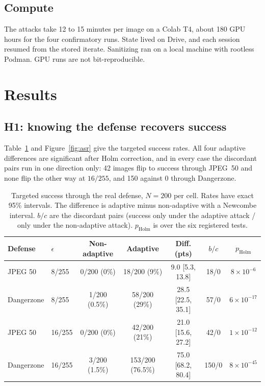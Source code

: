 \documentclass[11pt]{article}
\begin{document}
\subsection{Compute}
The attacks take 12 to 15 minutes per image on a Colab T4, about 180 GPU hours for the four
confirmatory runs. State lived on Drive, and each session resumed from the stored iterate.
Sanitizing ran on a local machine with rootless Podman. GPU runs are not bit-reproducible.

\section{Results}

\subsection{H1: knowing the defense recovers success}
Table~\ref{tab:h1} and Figure~\ref{fig:asr} give the targeted success rates. All four
adaptive differences are significant after Holm correction, and in every case the discordant
pairs run in one direction only: 42 images flip to success through JPEG~50 and none flip
the other way at $16/255$, and 150 against 0 through Dangerzone.

\begin{table}[t]
\centering
\caption{Targeted success through the real defense, $N=200$ per cell. Rates have exact 95\%
intervals. The difference is adaptive minus non-adaptive with a Newcombe interval. $b/c$ are
the discordant pairs (success only under the adaptive attack / only under the non-adaptive
attack). $p_{\mathrm{Holm}}$ is over the six registered tests.}
\label{tab:h1}
\footnotesize
\setlength{\tabcolsep}{3.5pt}
\begin{tabular}{llccccc}
\toprule
Defense & $\epsilon$ & Non-adaptive & Adaptive & Diff. (pts) & $b/c$ & $p_{\mathrm{Holm}}$ \\
\midrule
JPEG 50    & 8/255  & 0/200 (0\%)    & 18/200 (9\%)    & 9.0 [5.3, 13.8]   & 18/0   & $8\times10^{-6}$ \\
Dangerzone & 8/255  & 1/200 (0.5\%)  & 58/200 (29\%)   & 28.5 [22.5, 35.1] & 57/0   & $6\times10^{-17}$ \\
JPEG 50    & 16/255 & 0/200 (0\%)    & 42/200 (21\%)   & 21.0 [15.6, 27.2] & 42/0   & $1\times10^{-12}$ \\
Dangerzone & 16/255 & 3/200 (1.5\%)  & 153/200 (76.5\%) & 75.0 [68.2, 80.4] & 150/0  & $8\times10^{-45}$ \\
\bottomrule
\end{tabular}
\end{table}
\end{document}
